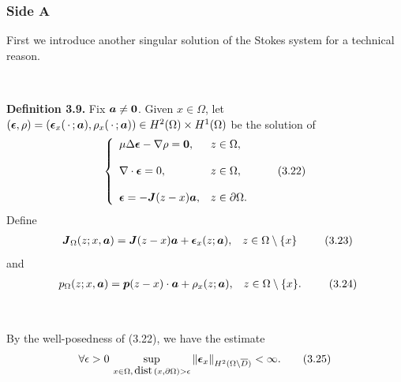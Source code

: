 \subsubsection{Side A}

First we introduce another singular solution of the Stokes system for a technical reason.


$\quad$



{\bf\noindent Definition 3.9.}  Fix $\mbox{\boldmath $a$}\not=\mbox{\boldmath $0$}$.
Given $x\in\Omega$, let $(\mbox{\boldmath $\epsilon$}, \rho)
=(\mbox{\boldmath $\epsilon$}_x(\,\cdot\,;\mbox{\boldmath $a$}), \rho_x(\,\cdot\,;\mbox{\boldmath $a$}))\in H^2(\Omega)\times H^1(\Omega)$ be the solution of
 $$\left\{
 \begin{array}{ll}
 \mu\Delta\mbox{\boldmath $\epsilon$}-\nabla \rho=\mbox{\boldmath $0$}, & z\in\Omega,
 \\
 \\
 \displaystyle
 \nabla\cdot\mbox{\boldmath $\epsilon$}=0, &  z\in\Omega,
 \\
 \\
 \displaystyle
 \mbox{\boldmath $\epsilon$}=-\mbox{\boldmath $J$}(z-x)\mbox{\boldmath $a$}, & z\in\partial\Omega.
 \end{array}
 \right.
 \tag {3.22}
 $$
Define
$$
\begin{array}{ll}
\displaystyle
\mbox{\boldmath $J$}_{\Omega}(z;x,\mbox{\boldmath $a$})=\mbox{\boldmath $J$}(z-x)\mbox{\boldmath $a$}+\mbox{\boldmath $\epsilon$}_x(z;\mbox{\boldmath $a$}),
& z\in\Omega\setminus\{x\}
\end{array}
\tag {3.23}
$$
and
$$
\begin{array}{ll}
\displaystyle
p_{\Omega}(z;x,\mbox{\boldmath $a$})=\mbox{\boldmath $p$}(z-x)\cdot\mbox{\boldmath $a$}+\rho_x(z;\mbox{\boldmath $a$}),
& z\in\Omega\setminus\{x\}.
\end{array}
\tag {3.24}
$$
 


$\quad$


 By the well-posedness of (3.22), we have the estimate
 $$\displaystyle
 \forall\epsilon>0 \,\sup_{x\in\Omega,\,\text{dist}\,(x,\partial\Omega)>\epsilon}
 \Vert\mbox{\boldmath $\epsilon$}_x\Vert_{H^2(\Omega\setminus\overline{D})}<\infty.
 \tag {3.25}
 $$








